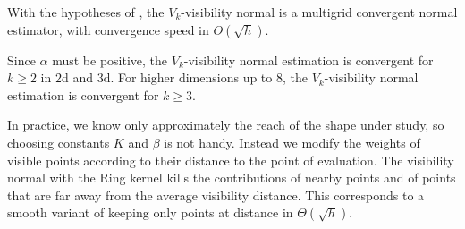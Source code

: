 \begin{corollary}
    \label{cor-convergence}
    With the hypotheses of , the
    $V_k$-visibility normal is a multigrid convergent normal estimator,
    with convergence speed in $O(\sqrt{h})$.
\end{corollary}

\begin{remark}
    Since $\alpha$ must be positive, the $V_k$-visibility normal estimation is
    convergent for $k \ge 2$ in $2$d and $3$d. For higher dimensions up to $8$, the
    $V_k$-visibility normal estimation is convergent for $k \ge 3$.
\end{remark}
\begin{remark}
    In practice, we know only approximately the reach of the shape
    under study, so choosing constants $K$ and $\beta$ is not handy.
    Instead we modify the weights of visible points according to their
    distance to the point of evaluation. The visibility normal with
    the Ring kernel kills the contributions of nearby points and of points
    that are far away from the average visibility distance. This
    corresponds to a smooth variant of keeping only points at distance
    in $\Theta(\sqrt{h})$.
\end{remark}


